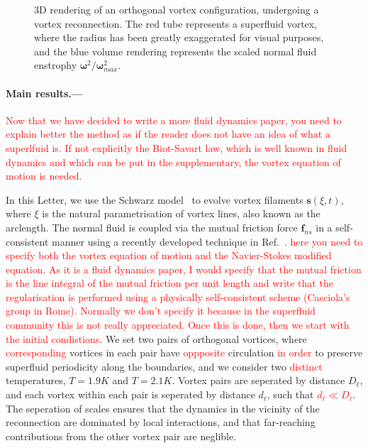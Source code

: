 \documentclass[%
 reprint,
 amsmath,amssymb,
 aps,
 prl,
]{revtex4-2}
\newcommand{\bom}{\boldsymbol{\omega}}
\def \s{\mathbf{s}}
\def\red#1{\textcolor{red}{#1}}
\begin{document}
\begin{figure}
\begin{subfigure}[b]{0.24\textwidth}
	\end{subfigure}
    \hfill
	\caption{3D rendering of an orthogonal vortex configuration, undergoing a vortex reconnection. The red tube represents a superfluid vortex, where the radius has been greatly exaggerated for visual purposes, and the blue volume rendering represents the scaled normal fluid enstrophy $\bom^2/\bom^2_{max}$.}
    \label{fig:visualisation}
\end{figure}







\paragraph*{Main results.---} 

\red{Now that we have decided to write a more fluid dynamics paper, you need to explain better the method as if the reader does not have an idea of what a superlfuid is. If not explicitly the Biot-Savart law, which is well known in fluid dynamics and which can be put in the supplementary, 
the vortex equation of motion is needed. 
}

In this Letter, we use the Schwarz model~\cite{schwarz1988} to evolve vortex filaments $\s(\xi,t)$, where $\xi$ is the natural parametrisation of vortex lines, also known as the arclength. The normal fluid is coupled via the mutual friction force $\mathbf{f}_{ns}$ in a self-consistent manner using a recently developed technique in Ref.~\cite{galantucciNewSelfconsistentApproach2020b}. \red{here you need to specify both the vortex equation of motion and the Navier-Stokes modified equation. As it is a fluid dynamics paper, I would specify that the mutual friction is the line integral of the mutual friction per unit length and write that the regularisation is performed using a physically self-consistent scheme (Casciola's group in Rome). Normally we don't specify it because in the superfluid community this is not really appreciated. Once this is done, then we start with the initial condistions}. We set two pairs of orthogonal vortices, where \red{corresponding} vortices in each pair have \red{oppposite} circulation \red{in order} to preserve superfluid periodicity along the boundaries, and we consider two \red{distinct} temperatures, $T=1.9K$ and $T=2.1K$. Vortex pairs are seperated by distance $D_{\ell}$, and each vortex within each pair is seperated by distance $d_{\ell}$, such that \red{$d_{\ell}\ll D_{\ell}$}. The seperation of scales ensures that the dynamics in the vicinity of the reconnection are dominated by local interactions, and that far-reaching contributions from the other vortex pair are neglible. 
\end{document}
